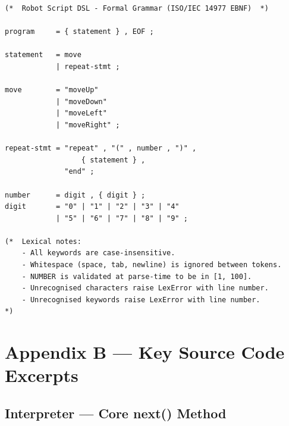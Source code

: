 \documentclass[12pt,a4paper]{article}
\begin{document}
\begin{tcolorbox}[codebox, title={Robot Script — Complete Formal Specification}]
\begin{lstlisting}[style=ebnf]
(*  Robot Script DSL - Formal Grammar (ISO/IEC 14977 EBNF)  *)

program     = { statement } , EOF ;

statement   = move
            | repeat-stmt ;

move        = "moveUp"
            | "moveDown"
            | "moveLeft"
            | "moveRight" ;

repeat-stmt = "repeat" , "(" , number , ")" ,
                  { statement } ,
              "end" ;

number      = digit , { digit } ;
digit       = "0" | "1" | "2" | "3" | "4"
            | "5" | "6" | "7" | "8" | "9" ;

(*  Lexical notes:
    - All keywords are case-insensitive.
    - Whitespace (space, tab, newline) is ignored between tokens.
    - NUMBER is validated at parse-time to be in [1, 100].
    - Unrecognised characters raise LexError with line number.
    - Unrecognised keywords raise LexError with line number.
*)
\end{lstlisting}
\end{tcolorbox}

\section{Appendix B — Key Source Code Excerpts}

\subsection{Interpreter — Core next() Method}
\end{document}
